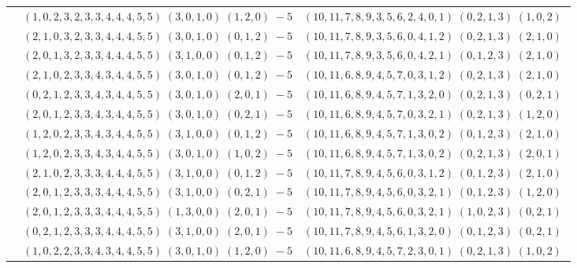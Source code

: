 \documentclass[11pt]{article}
\begin{document}
\begin{longtable}[l]{|c|c|c|}
 \cline{2-3} 
 & $(1 ,0 ,2 ,3 ,2 ,3 ,3 ,4 ,4 ,4 ,5 ,5) \;(3 ,0 ,1 ,0) \;(1 ,2 ,0) \;-5$ & $(10 ,11 ,7 ,8 ,9 ,3 ,5 ,6 ,2 ,4 ,0 ,1) \;(0 ,2 ,1 ,3) \;(1 ,0 ,2) \;$\\ 
 \cline{2-3} 
 & $(2 ,1 ,0 ,3 ,2 ,3 ,3 ,4 ,4 ,4 ,5 ,5) \;(3 ,0 ,1 ,0) \;(0 ,1 ,2) \;-5$ & $(10 ,11 ,7 ,8 ,9 ,3 ,5 ,6 ,0 ,4 ,1 ,2) \;(0 ,2 ,1 ,3) \;(2 ,1 ,0) \;$\\ 
 \cline{2-3} 
 & $(2 ,0 ,1 ,3 ,2 ,3 ,3 ,4 ,4 ,4 ,5 ,5) \;(3 ,1 ,0 ,0) \;(0 ,1 ,2) \;-5$ & $(10 ,11 ,7 ,8 ,9 ,3 ,5 ,6 ,0 ,4 ,2 ,1) \;(0 ,1 ,2 ,3) \;(2 ,1 ,0) \;$\\ 
 \cline{2-3} 
 & $(2 ,1 ,0 ,2 ,3 ,3 ,4 ,3 ,4 ,4 ,5 ,5) \;(3 ,0 ,1 ,0) \;(0 ,1 ,2) \;-5$ & $(10 ,11 ,6 ,8 ,9 ,4 ,5 ,7 ,0 ,3 ,1 ,2) \;(0 ,2 ,1 ,3) \;(2 ,1 ,0) \;$\\ 
 \cline{2-3} 
 & $(0 ,2 ,1 ,2 ,3 ,3 ,4 ,3 ,4 ,4 ,5 ,5) \;(3 ,0 ,1 ,0) \;(2 ,0 ,1) \;-5$ & $(10 ,11 ,6 ,8 ,9 ,4 ,5 ,7 ,1 ,3 ,2 ,0) \;(0 ,2 ,1 ,3) \;(0 ,2 ,1) \;$\\ 
 \cline{2-3} 
 & $(2 ,0 ,1 ,2 ,3 ,3 ,4 ,3 ,4 ,4 ,5 ,5) \;(3 ,0 ,1 ,0) \;(0 ,2 ,1) \;-5$ & $(10 ,11 ,6 ,8 ,9 ,4 ,5 ,7 ,0 ,3 ,2 ,1) \;(0 ,2 ,1 ,3) \;(1 ,2 ,0) \;$\\ 
 \cline{2-3} 
 & $(1 ,2 ,0 ,2 ,3 ,3 ,4 ,3 ,4 ,4 ,5 ,5) \;(3 ,1 ,0 ,0) \;(0 ,1 ,2) \;-5$ & $(10 ,11 ,6 ,8 ,9 ,4 ,5 ,7 ,1 ,3 ,0 ,2) \;(0 ,1 ,2 ,3) \;(2 ,1 ,0) \;$\\ 
 \cline{2-3} 
 & $(1 ,2 ,0 ,2 ,3 ,3 ,4 ,3 ,4 ,4 ,5 ,5) \;(3 ,0 ,1 ,0) \;(1 ,0 ,2) \;-5$ & $(10 ,11 ,6 ,8 ,9 ,4 ,5 ,7 ,1 ,3 ,0 ,2) \;(0 ,2 ,1 ,3) \;(2 ,0 ,1) \;$\\ 
 \cline{2-3} 
 & $(2 ,1 ,0 ,2 ,3 ,3 ,3 ,4 ,4 ,4 ,5 ,5) \;(3 ,1 ,0 ,0) \;(0 ,1 ,2) \;-5$ & $(10 ,11 ,7 ,8 ,9 ,4 ,5 ,6 ,0 ,3 ,1 ,2) \;(0 ,1 ,2 ,3) \;(2 ,1 ,0) \;$\\ 
 \cline{2-3} 
 & $(2 ,0 ,1 ,2 ,3 ,3 ,3 ,4 ,4 ,4 ,5 ,5) \;(3 ,1 ,0 ,0) \;(0 ,2 ,1) \;-5$ & $(10 ,11 ,7 ,8 ,9 ,4 ,5 ,6 ,0 ,3 ,2 ,1) \;(0 ,1 ,2 ,3) \;(1 ,2 ,0) \;$\\ 
 \cline{2-3} 
 & $(2 ,0 ,1 ,2 ,3 ,3 ,3 ,4 ,4 ,4 ,5 ,5) \;(1 ,3 ,0 ,0) \;(2 ,0 ,1) \;-5$ & $(10 ,11 ,7 ,8 ,9 ,4 ,5 ,6 ,0 ,3 ,2 ,1) \;(1 ,0 ,2 ,3) \;(0 ,2 ,1) \;$\\ 
 \cline{2-3} 
 & $(0 ,2 ,1 ,2 ,3 ,3 ,3 ,4 ,4 ,4 ,5 ,5) \;(3 ,1 ,0 ,0) \;(2 ,0 ,1) \;-5$ & $(10 ,11 ,7 ,8 ,9 ,4 ,5 ,6 ,1 ,3 ,2 ,0) \;(0 ,1 ,2 ,3) \;(0 ,2 ,1) \;$\\ 
 \cline{2-3} 
 & $(1 ,0 ,2 ,2 ,3 ,3 ,4 ,3 ,4 ,4 ,5 ,5) \;(3 ,0 ,1 ,0) \;(1 ,2 ,0) \;-5$ & $(10 ,11 ,6 ,8 ,9 ,4 ,5 ,7 ,2 ,3 ,0 ,1) \;(0 ,2 ,1 ,3) \;(1 ,0 ,2) \;$\\ 

\end{longtable}
\end{document}
